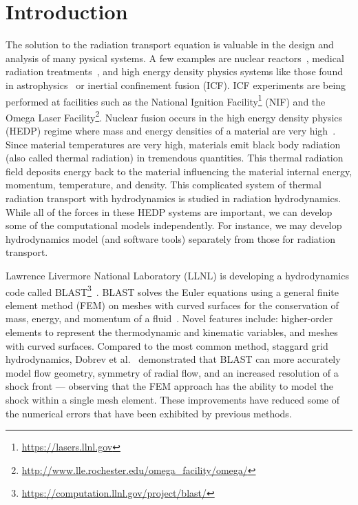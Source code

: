 \documentclass{article}
\begin{document}
\section{Introduction}
The solution to the radiation transport equation is valuable in the design and analysis of many pysical systems. A few examples are nuclear reactors~\cite{D&H}, medical radiation treatments~\cite{Sandwall2018Brachytherapy}, and high energy density physics systems like those found in astrophysics~\cite{Castor_Rad_Hydro} or inertial confinement fusion (ICF). ICF experiments are being performed at facilities such as the National Ignition Facility\footnote{\url{https://lasers.llnl.gov}} (NIF) and the Omega Laser Facility\footnote{\url{http://www.lle.rochester.edu/omega_facility/omega/}}. Nuclear fusion occurs in the high energy density physics (HEDP) regime where mass and energy densities of a material are very high~\cite{Castor_Rad_Hydro,DrakeHEDPPaper}. Since material temperatures are very high, materials emit black body radiation (also called thermal radiation) in tremendous quantities. This thermal radiation field deposits energy back to the material influencing the material internal energy, momentum, temperature, and density. This complicated system of thermal radiation transport with hydrodynamics is studied in radiation hydrodynamics. While all of the forces in these HEDP systems are important, we can develop some of the computational models independently. For instance, we may develop hydrodynamics model (and software tools) separately from those for radiation transport.

Lawrence Livermore National Laboratory (LLNL) is developing a hydrodynamics code called BLAST\footnote{\url{https://computation.llnl.gov/project/blast/}}~\cite{DobrevHOFEMHydro}. BLAST solves the Euler equations using a general finite element method (FEM) on meshes with curved surfaces for the conservation of mass, energy, and momentum of a fluid~\cite{DobrevCurvilinearFEMHydro}. Novel features include: higher-order elements to represent the thermodynamic and kinematic variables, and meshes with curved surfaces. Compared to the most common method, staggard grid hydrodynamics, Dobrev et al.~\cite{DobrevCurvilinearFEMHydro} demonstrated that BLAST can more accurately model flow geometry, symmetry of radial flow, and an increased resolution of a shock front --- observing that the FEM approach has the ability to model the shock within a single mesh element. These improvements have reduced some of the numerical errors that have been exhibited by previous methods.
\end{document}
